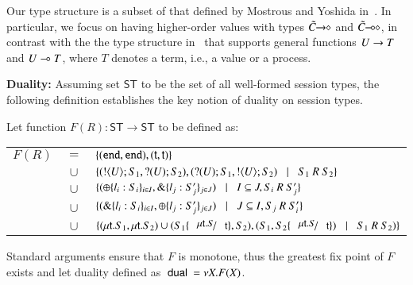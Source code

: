 Our type structure is a subset of that defined by Mostrous and Yoshida in~\cite{tlca07}.
In particular, we focus on having higher-order values with types
$\tilde{C}\!\! \rightarrow\!\! \diamond$ and $\tilde{C}\!\! \multimap\!\! \diamond$, in contrast with the the type structure
in~\cite{tlca07} that supports general functions
$U \rightarrow T$ and 
$U \multimap T$, where $T$ denotes a term, i.e., a value or a process.


{\bf Duality: }
Assuming set $\mathsf{ST}$ to be the set of all well-formed session types,
the following definition establishes the key notion of duality on session types.
%
\begin{definition}[Duality]\rm
	Let function $F(R): \mathsf{ST} \longrightarrow \mathsf{ST}$ to be defined as:

	\begin{tabular}{rcl}
		$F(R)$ &$=$&		$\{(\mathtt{end}, \mathtt{end}), (\mathsf{t}, \mathsf{t})\}$\\
			&$\cup$&	$\set{(\btout{U} S_1, \btinp{U} S_2), (\btinp{U} S_1, \btout{U} S_2) \bnfbar S_1\ R\ S_2}$\\
			&$\cup$&	$\{(\oplus \{l_i: S_i\}_{i \in I}, \& \{l_j: S_j'\}_{j \in J}) \;\;\;|\;\;\; I \subseteq J, S_i\ R\ S_j'\}$\\
			&$\cup$&	$\{(\& \{l_i: S_i\}_{i \in I}, \oplus \{l_j: S_j'\}_{j \in J}) \;\;\;|\;\;\; J \subseteq I, S_j\ R\ S_i'\}$\\
			&$\cup$&	$\set{(\trec{t}{S_1}, \trec{t}{S_2}) \cup (S_1 \subst{\trec{t}{S}}{\vart{t}}, S_2), (S_1, S_2\subst{\trec{t}{S}}{\vart{t}}) \bnfbar S_1\ R\ S_2)}$
	\end{tabular}
	
\noindent
	Standard arguments ensure that $F$ is monotone, thus the greatest fix point
	of $F$ exists and let duality defined as $\ \mathsf{dual}\  = \nu X. F(X)$.
\end{definition}
%



